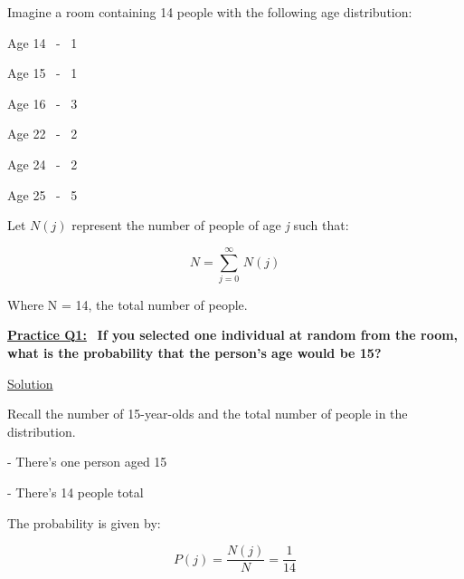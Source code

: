 Imagine a room containing 14 people with the following age distribution:

Age 14 \ - \ 1

Age 15 \ - \ 1

Age 16 \ - \ 3

Age 22 \ - \ 2

Age 24 \ - \ 2

Age 25 \ - \ 5

\bigskip

Let $N(j)$ represent the number of people of age \textit{j} such that:

\[
    N = \sum_{j=0}^{\infty} \, N(j)
\]

Where N = 14, the total number of people.

\bigskip \bigskip

\underline{\textbf{Practice Q1:}} \ \textbf{If you selected one individual at random from the room,
    what is the probability that the person's age would be 15?}

\bigskip

\underline{Solution}

Recall the number of 15-year-olds and the total number of people in the distribution.

- There's one person aged 15

- There's 14 people total

\bigskip

The probability is given by:

\[
    P(j) = \frac{N(j)}{N} = \boxed{\frac{1}{14}}
\]